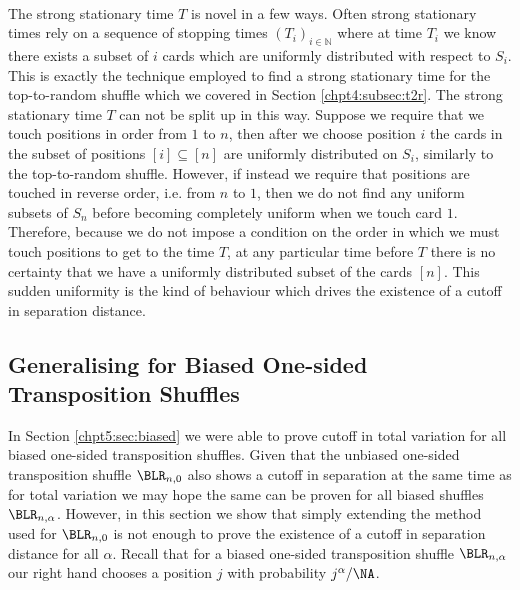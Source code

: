 \documentclass[11pt]{report}
\begin{document}
\paragraph{}
The
strong stationary time $T$ is novel in a few ways. 
Often strong stationary 
times rely on a sequence of stopping times $(T_{i})_{i\in \mathbb{N}}$ where at 
time $T_{i}$ we know there exists a subset of $i$ cards which are uniformly distributed with respect to $S_{i}$. This is exactly the technique employed to find a strong stationary time for the top-to-random shuffle which we covered in Section \ref{chpt4:subsec:t2r}.
The strong stationary time $T$ can not be split up in this way. Suppose we require that we 
touch positions in order from $1$ to $n$, then after we 
choose position $i$ the cards in the subset of positions 
$[i]\subseteq [n]$ are uniformly distributed on $S_{i}$, similarly to the top-to-random shuffle. 	
However, if instead we require that positions are touched in reverse order, i.e. from $n$ to $1$, then we do not find any uniform subsets of $S_{n}$ before becoming completely uniform when we touch card $1$. Therefore, because we do not impose a condition on the order in which we must touch positions to get to the time $T$,  at any particular time 
before $T$ there is no certainty that we have a uniformly distributed subset of the cards $[n]$. 
This sudden uniformity is the kind of behaviour which drives the existence of a cutoff in separation distance.










\subsection{Generalising for Biased One-sided Transposition Shuffles}
\label{chpt5:subsec:generalsst}

In Section \ref{chpt5:sec:biased} we were able to prove cutoff in total variation for all biased one-sided transposition shuffles. Given that the unbiased one-sided transposition shuffle $\BLR_{n,0}$ also shows a cutoff 
in separation at the same time as for total variation we may hope the same can 
be proven for all biased shuffles $\BLR_{n,\alpha}$. However, in this section 
we show that simply extending the method used for $\BLR_{n,0}$ is not enough to prove the existence of a cutoff in separation distance for all $\alpha$. Recall that for a biased 
one-sided transposition shuffle $\BLR_{n,\alpha}$ our right hand chooses a position $j$ with probability $j^{\alpha} / \NA$. 
\end{document}
